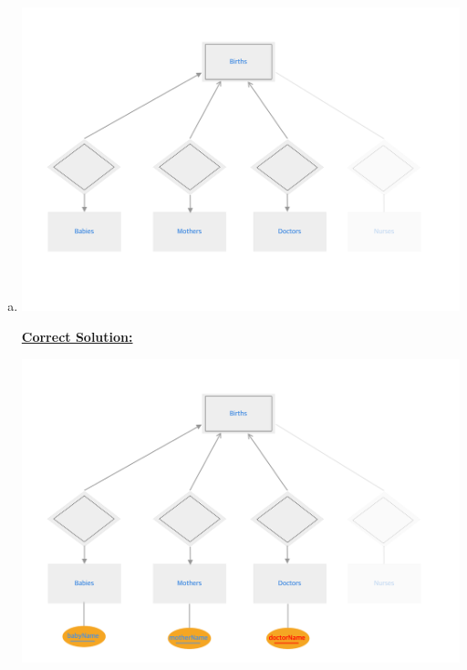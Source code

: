 \documentclass[12pt]{article}
\begin{document}
\begin{enumerate}[1.]
\begin{enumerate}[a)]
\begin{mdframed}
        \end{mdframed}

        \item

        \begin{center}
        \includegraphics[width=\linewidth]{images/worksheet_14_solution_63.png}
        \end{center}

        \bigskip

        \begin{mdframed}

            \underline{\textbf{Correct Solution:}}

            \bigskip

            \begin{center}
            \includegraphics[width=\linewidth]{images/worksheet_14_solution_64.png}
            \end{center}


\end{mdframed}
\end{enumerate}
\end{enumerate}
\end{document}
